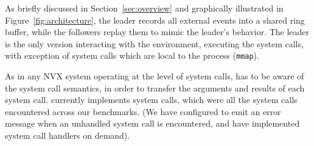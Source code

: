 As briefly discussed in Section~\ref{sec:overview} and graphically
illustrated in Figure~\ref{fig:architecture}, the leader records all
external events into a shared ring buffer, while the followers replay
them to mimic the leader's behavior. The leader
is the only version interacting with the environment, \ie executing
the system calls, with exception of system calls which are local to
the process (\eg \lstinline`mmap`). %

As in any NVX system operating at the level of system calls, \varan
has to be aware of the system call semantics, in order to transfer the
arguments and results of each system call.  \varan currently
implements \syscallsHandlers system calls, which were all the system
calls encountered across our benchmarks.  (We have configured \varan
to emit an error message when an unhandled system call is encountered,
and have implemented system call handlers on demand).







